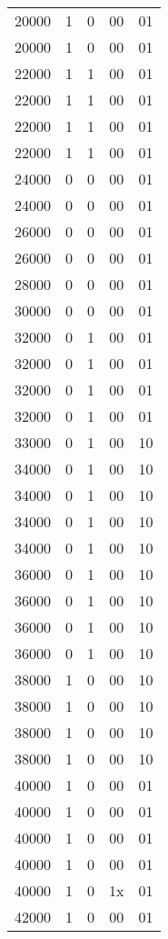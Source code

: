 \documentclass[paper=usletter, fontsize=12pt]{article}
\begin{document}
\begin{longtable*}{@{\extracolsep{\fill}} ccccc}
        20000 & 1 & 0 & 00 & 01 \\
        20000 & 1 & 0 & 00 & 01 \\
        22000 & 1 & 1 & 00 & 01 \\
        22000 & 1 & 1 & 00 & 01 \\
        22000 & 1 & 1 & 00 & 01 \\
        22000 & 1 & 1 & 00 & 01 \\
        24000 & 0 & 0 & 00 & 01 \\
        24000 & 0 & 0 & 00 & 01 \\
        26000 & 0 & 0 & 00 & 01 \\
        26000 & 0 & 0 & 00 & 01 \\
        28000 & 0 & 0 & 00 & 01 \\
        30000 & 0 & 0 & 00 & 01 \\
        32000 & 0 & 1 & 00 & 01 \\
        32000 & 0 & 1 & 00 & 01 \\
        32000 & 0 & 1 & 00 & 01 \\
        32000 & 0 & 1 & 00 & 01 \\
        33000 & 0 & 1 & 00 & 10 \\
        34000 & 0 & 1 & 00 & 10 \\
        34000 & 0 & 1 & 00 & 10 \\
        34000 & 0 & 1 & 00 & 10 \\
        34000 & 0 & 1 & 00 & 10 \\
        36000 & 0 & 1 & 00 & 10 \\
        36000 & 0 & 1 & 00 & 10 \\
        36000 & 0 & 1 & 00 & 10 \\
        36000 & 0 & 1 & 00 & 10 \\
        38000 & 1 & 0 & 00 & 10 \\
        38000 & 1 & 0 & 00 & 10 \\
        38000 & 1 & 0 & 00 & 10 \\
        38000 & 1 & 0 & 00 & 10 \\
        40000 & 1 & 0 & 00 & 01 \\
        40000 & 1 & 0 & 00 & 01 \\
        40000 & 1 & 0 & 00 & 01 \\
        40000 & 1 & 0 & 00 & 01 \\
        40000 & 1 & 0 & 1x & 01 \\
        42000 & 1 & 0 & 00 & 01 \\

\end{longtable*}
\end{document}
